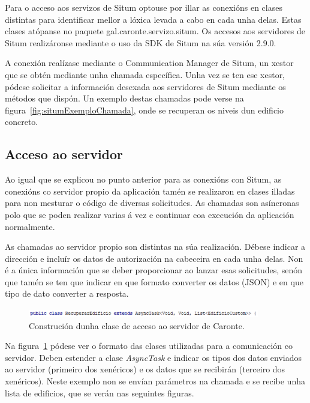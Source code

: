 Para o acceso aos servizos de Situm optouse por illar as conexións en clases distintas para identificar mellor a lóxica levada a cabo en cada unha delas. Estas clases atópanse no paquete gal.caronte.servizo.situm. Os accesos aos servidores de Situm realizáronse mediante o uso da SDK de Situm na súa versión 2.9.0.

A conexión realízase mediante o Communication Manager de Situm, un xestor que se obtén mediante unha chamada específica. Unha vez se ten ese xestor, pódese solicitar a información desexada aos servidores de Situm mediante os métodos que dispón. Un exemplo destas chamadas pode verse na figura~\ref{fig:situmExemploChamada}, onde se recuperan os niveis dun edificio concreto.


\subsection{Acceso ao servidor}
Ao igual que se explicou no punto anterior para as conexións con Situm, as conexións co servidor propio da aplicación tamén se realizaron en clases illadas para non mesturar o código de diversas solicitudes. As chamadas son asíncronas polo que se poden realizar varias á vez e continuar coa execución da aplicación normalmente.

As chamadas ao servidor propio son distintas na súa realización. Débese indicar a dirección e incluír os datos de autorización na cabeceira en cada unha delas. Non é a única información que se deber proporcionar ao lanzar esas solicitudes, senón que tamén se ten que indicar en que formato converter os datos (JSON) e en que tipo de dato converter a resposta.

\begin{figure}[htb] 
	\begin{center}
		\includegraphics[width=0.9\textwidth]{figures/codigo/chamadaServidorDefinicion}
		\caption{Construción dunha clase de acceso ao servidor de Caronte.}
		\label{fig:chamadaServidorDefinicion}
	\end{center}
\end{figure}

Na figura~\ref{fig:chamadaServidorDefinicion} pódese ver o formato das clases utilizadas para a comunicación co servidor. Deben estender a clase \emph{AsyncTask} e indicar os tipos dos datos enviados ao servidor (primeiro dos xenéricos) e os datos que se recibirán (terceiro dos xenéricos). Neste exemplo non se envían parámetros na chamada e se recibe unha lista de edificios, que se verán nas seguintes figuras.

